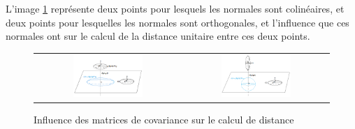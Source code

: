 L'image \ref{fig_cov} représente deux points pour lesquels les normales sont colinéaires, et deux points pour lesquelles les normales sont orthogonales, et l'influence que ces normales ont sur le calcul de la distance unitaire entre ces deux points.

\begin{figure}[H]
\centering
\begin{tabular}{cc}
\includegraphics[width = 0.5\textwidth]{Images/Proposition/covcol} &
\includegraphics[width = 0.5\textwidth]{Images/Proposition/covorth}
\end{tabular}
\caption{Influence des matrices de covariance sur le calcul de distance}
\label{fig_cov}
\end{figure}






